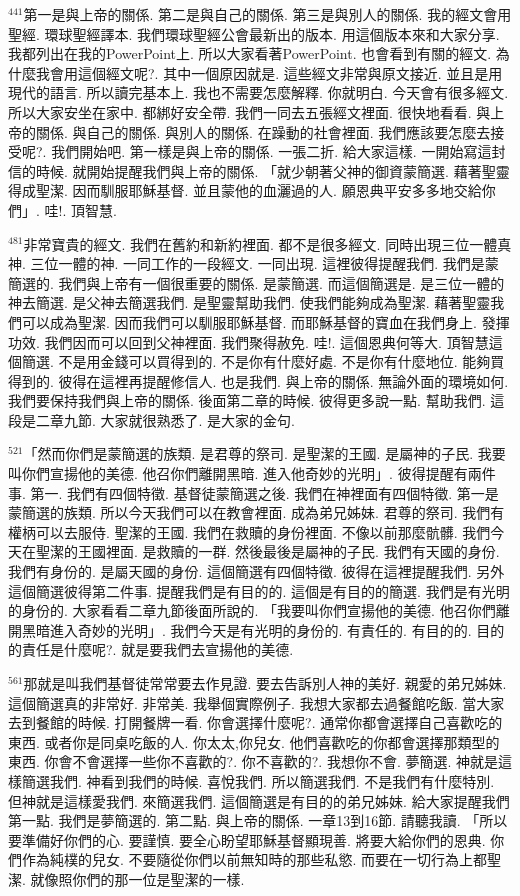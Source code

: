 \documentclass{book}
\begin{document}
$^{441}$第一是與上帝的關係.
第二是與自己的關係.
第三是與別人的關係.
我的經文會用聖經.
環球聖經譯本.
我們環球聖經公會最新出的版本.
用這個版本來和大家分享.
我都列出在我的PowerPoint上.
所以大家看著PowerPoint.
也會看到有關的經文.
為什麼我會用這個經文呢?.
其中一個原因就是.
這些經文非常與原文接近.
並且是用現代的語言.
所以讀完基本上.
我也不需要怎麼解釋.
你就明白.
今天會有很多經文.
所以大家安坐在家中.
都綁好安全帶.
我們一同去五張經文裡面.
很快地看看.
與上帝的關係.
與自己的關係.
與別人的關係.
在躁動的社會裡面.
我們應該要怎麼去接受呢?.
我們開始吧.
第一樣是與上帝的關係.
一張二折.
給大家這樣.
一開始寫這封信的時候.
就開始提醒我們與上帝的關係.
「就少朝著父神的御資蒙簡選.
藉著聖靈得成聖潔.
因而馴服耶穌基督.
並且蒙他的血灑過的人.
願恩典平安多多地交給你們」.
哇!.
頂智慧.

$^{481}$非常寶貴的經文.
我們在舊約和新約裡面.
都不是很多經文.
同時出現三位一體真神.
三位一體的神.
一同工作的一段經文.
一同出現.
這裡彼得提醒我們.
我們是蒙簡選的.
我們與上帝有一個很重要的關係.
是蒙簡選.
而這個簡選是.
是三位一體的神去簡選.
是父神去簡選我們.
是聖靈幫助我們.
使我們能夠成為聖潔.
藉著聖靈我們可以成為聖潔.
因而我們可以馴服耶穌基督.
而耶穌基督的寶血在我們身上.
發揮功效.
我們因而可以回到父神裡面.
我們聚得赦免.
哇!.
這個恩典何等大.
頂智慧這個簡選.
不是用金錢可以買得到的.
不是你有什麼好處.
不是你有什麼地位.
能夠買得到的.
彼得在這裡再提醒修信人.
也是我們.
與上帝的關係.
無論外面的環境如何.
我們要保持我們與上帝的關係.
後面第二章的時候.
彼得更多說一點.
幫助我們.
這段是二章九節.
大家就很熟悉了.
是大家的金句.

$^{521}$「然而你們是蒙簡選的族類.
是君尊的祭司.
是聖潔的王國.
是屬神的子民.
我要叫你們宣揚他的美德.
他召你們離開黑暗.
進入他奇妙的光明」.
彼得提醒有兩件事.
第一.
我們有四個特徵.
基督徒蒙簡選之後.
我們在神裡面有四個特徵.
第一是蒙簡選的族類.
所以今天我們可以在教會裡面.
成為弟兄姊妹.
君尊的祭司.
我們有權柄可以去服侍.
聖潔的王國.
我們在救贖的身份裡面.
不像以前那麼骯髒.
我們今天在聖潔的王國裡面.
是救贖的一群.
然後最後是屬神的子民.
我們有天國的身份.
我們有身份的.
是屬天國的身份.
這個簡選有四個特徵.
彼得在這裡提醒我們.
另外這個簡選彼得第二件事.
提醒我們是有目的的.
這個是有目的的簡選.
我們是有光明的身份的.
大家看看二章九節後面所說的.
「我要叫你們宣揚他的美德.
他召你們離開黑暗進入奇妙的光明」.
我們今天是有光明的身份的.
有責任的.
有目的的.
目的的責任是什麼呢?.
就是要我們去宣揚他的美德.

$^{561}$那就是叫我們基督徒常常要去作見證.
要去告訴別人神的美好.
親愛的弟兄姊妹.
這個簡選真的非常好.
非常美.
我舉個實際例子.
我想大家都去過餐館吃飯.
當大家去到餐館的時候.
打開餐牌一看.
你會選擇什麼呢?.
通常你都會選擇自己喜歡吃的東西.
或者你是同桌吃飯的人.
你太太,你兒女.
他們喜歡吃的你都會選擇那類型的東西.
你會不會選擇一些你不喜歡的?.
你不喜歡的?.
我想你不會.
夢簡選.
神就是這樣簡選我們.
神看到我們的時候.
喜悅我們.
所以簡選我們.
不是我們有什麼特別.
但神就是這樣愛我們.
來簡選我們.
這個簡選是有目的的弟兄姊妹.
給大家提醒我們第一點.
我們是夢簡選的.
第二點.
與上帝的關係.
一章13到16節.
請聽我讀.
「所以要準備好你們的心.
要謹慎.
要全心盼望耶穌基督顯現善.
將要大給你們的恩典.
你們作為純樸的兒女.
不要隨從你們以前無知時的那些私慾.
而要在一切行為上都聖潔.
就像照你們的那一位是聖潔的一樣.
\end{document}
